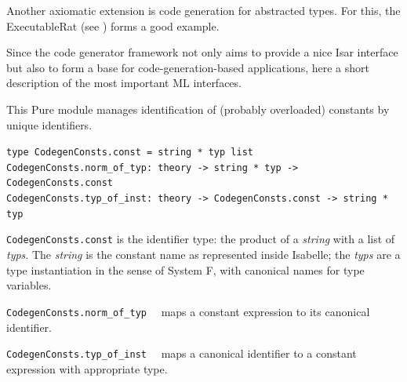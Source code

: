 \begin{isabellebody}
\begin{isamarkuptext}
  Another axiomatic extension is code generation
  for abstracted types.  For this, the  
  ExecutableRat (see )
  forms a good example.%
\end{isamarkuptext}%
\isamarkuptrue%
%
\isamarkuptrue%
%
\begin{isamarkuptext}%
Since the code generator framework not only aims to provide
  a nice Isar interface but also to form a base for
  code-generation-based applications, here a short
  description of the most important ML interfaces.%
\end{isamarkuptext}%
\isamarkuptrue%
%
\isamarkuptrue%
%
\begin{isamarkuptext}%
This Pure module manages identification of (probably overloaded)
  constants by unique identifiers.%
\end{isamarkuptext}%
\isamarkuptrue%
%
\isadelimmlref
%
\endisadelimmlref
%
\isatagmlref
%
\begin{isamarkuptext}%
\begin{mldecls}
  \verb|type CodegenConsts.const = string * typ list| \\
  \verb|CodegenConsts.norm_of_typ: theory -> string * typ -> CodegenConsts.const| \\
  \verb|CodegenConsts.typ_of_inst: theory -> CodegenConsts.const -> string * typ| \\
 \end{mldecls}

  \begin{description}

  \item \verb|CodegenConsts.const| is the identifier type:
     the product of a \emph{string} with a list of \emph{typs}.
     The \emph{string} is the constant name as represented inside Isabelle;
     the \emph{typs} are a type instantiation in the sense of System F,
     with canonical names for type variables.

  \item \verb|CodegenConsts.norm_of_typ|~~
     maps a constant expression  to its canonical identifier.

  \item \verb|CodegenConsts.typ_of_inst|~~
     maps a canonical identifier  to a constant
     expression with appropriate type.


\end{description}
\end{isamarkuptext}
\end{isabellebody}
